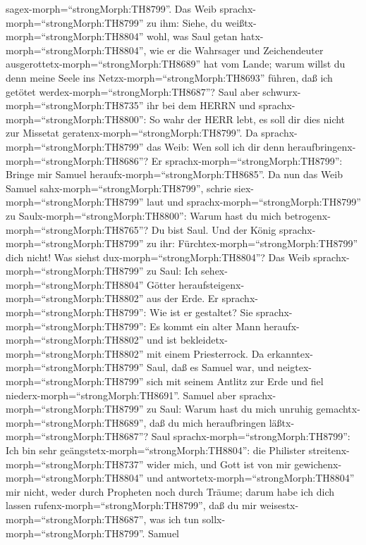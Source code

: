 sagex-morph=``strongMorph:TH8799''.  Das Weib
sprachx-morph=``strongMorph:TH8799'' zu ihm: Siehe, du
weißtx-morph=``strongMorph:TH8804'' wohl, was Saul getan
hatx-morph=``strongMorph:TH8804'', wie er die Wahrsager und
Zeichendeuter ausgerottetx-morph=``strongMorph:TH8689'' hat vom Lande;
warum willst du denn meine Seele ins Netzx-morph=``strongMorph:TH8693''
führen, daß ich getötet werdex-morph=``strongMorph:TH8687''?
 Saul aber schwurx-morph=``strongMorph:TH8735'' ihr bei dem
HERRN und sprachx-morph=``strongMorph:TH8800'': So wahr der HERR lebt,
es soll dir dies nicht zur Missetat
geratenx-morph=``strongMorph:TH8799''.  Da
sprachx-morph=``strongMorph:TH8799'' das Weib: Wen soll ich dir denn
heraufbringenx-morph=``strongMorph:TH8686''? Er
sprachx-morph=``strongMorph:TH8799'': Bringe mir Samuel
heraufx-morph=``strongMorph:TH8685''.  Da nun das Weib
Samuel sahx-morph=``strongMorph:TH8799'', schrie
siex-morph=``strongMorph:TH8799'' laut und
sprachx-morph=``strongMorph:TH8799'' zu
Saulx-morph=``strongMorph:TH8800'': Warum hast du mich
betrogenx-morph=``strongMorph:TH8765''? Du bist Saul.  Und
der König sprachx-morph=``strongMorph:TH8799'' zu ihr:
Fürchtex-morph=``strongMorph:TH8799'' dich nicht! Was siehst
dux-morph=``strongMorph:TH8804''? Das Weib
sprachx-morph=``strongMorph:TH8799'' zu Saul: Ich
sehex-morph=``strongMorph:TH8804'' Götter
heraufsteigenx-morph=``strongMorph:TH8802'' aus der Erde. 
Er sprachx-morph=``strongMorph:TH8799'': Wie ist er gestaltet? Sie
sprachx-morph=``strongMorph:TH8799'': Es kommt ein alter Mann
heraufx-morph=``strongMorph:TH8802'' und ist
bekleidetx-morph=``strongMorph:TH8802'' mit einem Priesterrock. Da
erkanntex-morph=``strongMorph:TH8799'' Saul, daß es Samuel war, und
neigtex-morph=``strongMorph:TH8799'' sich mit seinem Antlitz zur Erde
und fiel niederx-morph=``strongMorph:TH8691''.  Samuel aber
sprachx-morph=``strongMorph:TH8799'' zu Saul: Warum hast du mich unruhig
gemachtx-morph=``strongMorph:TH8689'', daß du mich heraufbringen
läßtx-morph=``strongMorph:TH8687''? Saul
sprachx-morph=``strongMorph:TH8799'': Ich bin sehr
geängstetx-morph=``strongMorph:TH8804'': die Philister
streitenx-morph=``strongMorph:TH8737'' wider mich, und Gott ist von mir
gewichenx-morph=``strongMorph:TH8804'' und
antwortetx-morph=``strongMorph:TH8804'' mir nicht, weder durch Propheten
noch durch Träume; darum habe ich dich lassen
rufenx-morph=``strongMorph:TH8799'', daß du mir
weisestx-morph=``strongMorph:TH8687'', was ich tun
sollx-morph=``strongMorph:TH8799''.  Samuel
